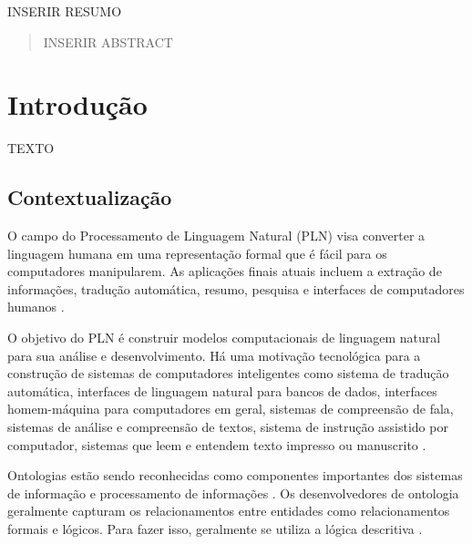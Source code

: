\documentclass{bcc}
\begin{document}

\capa



\begin{resumo}
INSERIR RESUMO
\end{resumo}

\begin{abstract}
INSERIR ABSTRACT
\end{abstract}

\renewcommand\contentsname{\centerline{Sumário}}
\renewcommand\listfigurename{\centerline{Lista de Figuras}}
\renewcommand\listtablename{\centerline{Lista de Tabelas}}

\tableofcontents

\listoffigures
{}

\listoftables
{}

\inicio
\chapter{Introdução}

TEXTO


\section {Contextualização}

O campo do Processamento de Linguagem Natural (PLN) visa converter a linguagem humana em uma representação formal que é fácil para os computadores manipularem. As aplicações finais atuais incluem a extração de informações, tradução automática, resumo, pesquisa e interfaces de computadores humanos \cite{collobert2008}.

O objetivo do PLN é construir modelos computacionais de linguagem natural para sua análise e desenvolvimento. Há uma motivação tecnológica para a construção de sistemas de computadores inteligentes como sistema de tradução automática, interfaces de linguagem natural para bancos de dados, interfaces homem-máquina para computadores em geral, sistemas de compreensão de fala, sistemas de análise e compreensão de textos, sistema de instrução assistido por computador, sistemas que leem e entendem texto impresso ou manuscrito \cite{bharati1995}.

Ontologias estão sendo reconhecidas como componentes importantes dos sistemas de informação e processamento de informações \cite{estival2004}. Os desenvolvedores de ontologia geralmente capturam os relacionamentos entre entidades como relacionamentos formais e lógicos. Para fazer isso, geralmente se utiliza a lógica descritiva \cite{liu2011}.
\end{document}
